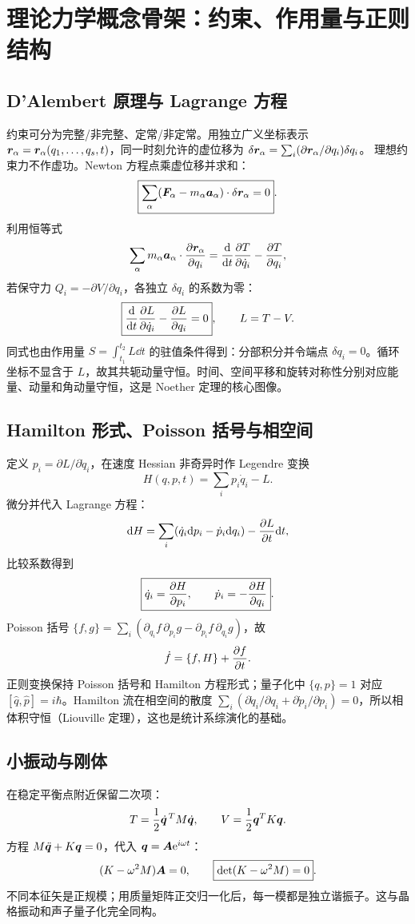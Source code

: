 \chapter{理论力学概念骨架：约束、作用量与正则结构}
\section{D'Alembert 原理与 Lagrange 方程}
约束可分为完整/非完整、定常/非定常。用独立广义坐标表示
$\bm{r}_\alpha=\bm{r}_\alpha(q_1,\ldots,q_s,t)$，同一时刻允许的虚位移为
$\delta\bm{r}_\alpha=\sum_i(\partial\bm{r}_\alpha/\partial q_i)\delta q_i$。
理想约束力不作虚功。Newton 方程点乘虚位移并求和：
\[
\boxed{\sum_\alpha(\bm{F}_\alpha-m_\alpha\bm{a}_\alpha)\cdot\delta\bm{r}_\alpha=0}.
\]
利用恒等式
\[
\sum_\alpha m_\alpha\bm{a}_\alpha\cdot\frac{\partial \bm{r}_\alpha}{\partial q_i}
=\frac{\mathrm d }{\mathrm d t}\frac{\partial T}{\partial \dot q_i}-\frac{\partial T}{\partial q_i},
\]
若保守力 $Q_i=-\partial V/\partial q_i$，各独立 $\delta q_i$ 的系数为零：
\[
\boxed{\frac{\mathrm d }{\mathrm d t}\frac{\partial L}{\partial \dot q_i}-\frac{\partial L}{\partial q_i}=0},\qquad L=T-V.
\]
同式也由作用量 $S=\int_{t_1}^{t_2}L\dd t$ 的驻值条件得到：分部积分并令端点
$\delta q_i=0$。循环坐标不显含于 $L$，故其共轭动量守恒。时间、空间平移和旋转对称性分别对应能量、动量和角动量守恒，这是 Noether 定理的核心图像。

\section{Hamilton 形式、Poisson 括号与相空间}
定义 $p_i=\partial L/\partial\dot q_i$，在速度 Hessian 非奇异时作 Legendre 变换
\[
H(q,p,t)=\sum_i p_i\dot q_i-L.
\]
微分并代入 Lagrange 方程：
\[
\mathrm d H=\sum_i(\dot q_i\mathrm d p_i-\dot p_i\mathrm d q_i)-\frac{\partial L}{\partial t}\mathrm d t,
\]
比较系数得到
\[
\boxed{\dot q_i=\frac{\partial H}{\partial p_i},\qquad\dot p_i=-\frac{\partial H}{\partial q_i}}.
\]
Poisson 括号
$\{f,g\}=\sum_i(\partial_{q_i}f\,\partial_{p_i}g-\partial_{p_i}f\,\partial_{q_i}g)$，故
\[
\dot f=\{f,H\}+\frac{\partial f}{\partial t}.
\]
正则变换保持 Poisson 括号和 Hamilton 方程形式；量子化中
$\{q,p\}=1$ 对应 $[\hat q,\hat p]=i\hbar$。Hamilton 流在相空间的散度
$\sum_i(\partial\dot q_i/\partial q_i+\partial\dot p_i/\partial p_i)=0$，所以相体积守恒（Liouville 定理），这也是统计系综演化的基础。

\section{小振动与刚体}
在稳定平衡点附近保留二次项：
\[
T=\frac12\dot{\bm{q}}^{\,T}M\dot{\bm{q}},\qquad
V=\frac12\bm{q}^{T}K\bm{q}.
\]
方程 $M\ddot{\bm{q}}+K\bm{q}=0$，代入 $\bm{q}=\bm{A}\mathrm e^{i\omega t}$：
\[
(K-\omega^2M)\bm{A}=0,\qquad\boxed{\det(K-\omega^2M)=0}.
\]
不同本征矢是正规模；用质量矩阵正交归一化后，每一模都是独立谐振子。这与晶格振动和声子量子化完全同构。

